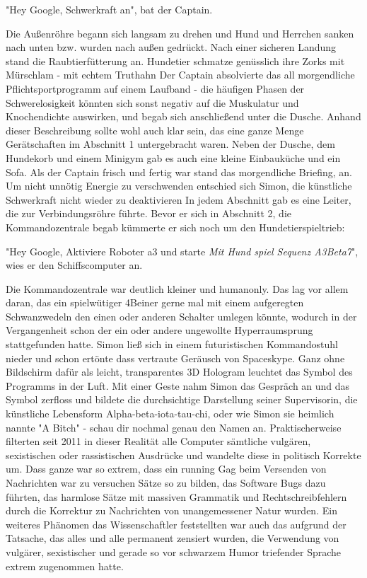 \documentclass[ebook]{article}
\begin{document}
\begin{center}
"Hey Google, Schwerkraft an", bat der Captain.
\end{center}

Die Außenröhre begann sich langsam zu drehen und Hund und Herrchen
sanken nach unten bzw. wurden nach außen gedrückt. Nach einer
sicheren Landung stand die Raubtierfütterung an. Hundetier schmatze
genüsslich ihre Zorks mit Mürschlam - mit echtem Truthahn Der
Captain absolvierte das all morgendliche Pflichtsportprogramm auf
einem Laufband - die häufigen Phasen der Schwerelosigkeit könnten
sich sonst negativ auf die Muskulatur und Knochendichte auswirken,
und begab sich anschließend unter die Dusche. Anhand dieser
Beschreibung sollte wohl auch klar sein, das eine ganze Menge
Gerätschaften im Abschnitt 1 untergebracht waren. Neben der Dusche,
dem Hundekorb und einem Minigym gab es auch eine kleine Einbauküche
und ein Sofa. Als der Captain frisch und fertig war stand das
morgendliche Briefing, an. Um nicht unnötig Energie zu verschwenden
entschied sich Simon, die künstliche Schwerkraft nicht wieder zu
deaktivieren In jedem Abschnitt gab es eine Leiter, die zur
Verbindungsröhre führte. Bevor er sich in Abschnitt 2, die
Kommandozentrale begab kümmerte er sich noch um den
Hundetierspieltrieb:

\begin{center}
"Hey Google, Aktiviere Roboter a3 und starte \emph{Mit Hund spiel Sequenz
A3Beta7}", wies er den Schiffscomputer an.
\end{center}

\noindent Die Kommandozentrale war deutlich kleiner und
humanonly. Das lag vor allem daran, das ein spielwütiger 4Beiner
gerne mal mit einem aufgeregten Schwanzwedeln den einen oder anderen
Schalter umlegen könnte, wodurch in der Vergangenheit schon der ein
oder andere ungewollte Hyperraumsprung stattgefunden hatte. Simon
ließ sich in einem futuristischen Kommandostuhl nieder und schon
ertönte dass vertraute Geräusch von Spaceskype. Ganz ohne Bildschirm
dafür als leicht, transparentes 3D Hologram leuchtet das Symbol des
Programms in der Luft. Mit einer Geste nahm Simon das Gespräch an und
das Symbol zerfloss und bildete die durchsichtige Darstellung seiner
Supervisorin, die künstliche Lebensform Alpha-beta-iota-tau-chi,
oder wie Simon sie heimlich nannte "A Bitch" - schau dir nochmal
genau den Namen an. Praktischerweise filterten seit 2011 in dieser
Realität alle Computer sämtliche vulgären, sexistischen oder
rassistischen Ausdrücke und wandelte diese in politisch Korrekte
um. Dass ganze war so extrem, dass ein running Gag beim Versenden
von Nachrichten war zu versuchen Sätze so zu bilden, das Software
Bugs dazu führten, das harmlose Sätze mit massiven Grammatik und
Rechtschreibfehlern durch die Korrektur zu Nachrichten von
unangemessener Natur wurden. Ein weiteres Phänomen das
Wissenschaftler feststellten war auch das aufgrund der Tatsache, das
alles und alle permanent zensiert wurden, die Verwendung von
vulgärer, sexistischer und gerade so vor schwarzem Humor triefender
Sprache extrem zugenommen hatte.
\end{document}

